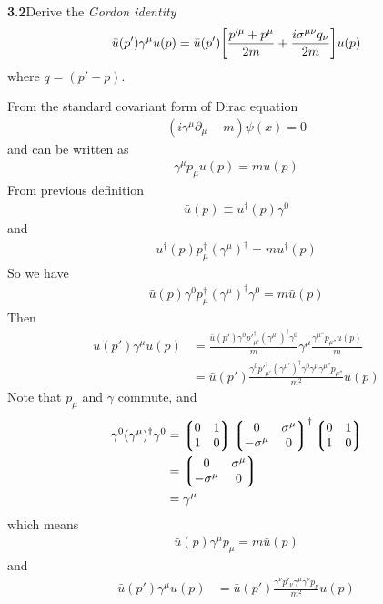 \documentclass{article}
\begin{document}
{\bf{3.2}}\quad Derive the \emph{Gordon identity}
\begin{align}\label{40}
  \bar{u}(p')\gamma^{\mu}u(p)=\bar{u}(p')\bqty{\frac{p'^{\mu}+p^{\mu}}{2m}+\frac{i\sigma^{\mu\nu}q_{\nu}}{2m}}u(p)
\end{align}
where $q=(p'-p)$.

From the standard covariant form of Dirac equation
\begin{align*}
  (i\gamma^{\mu}\partial_{\mu}-m)\psi(x)=0
\end{align*}
and can be written as
\begin{align}
  \gamma^{\mu}p_{\mu}u(p)=m u(p)
\end{align}
From previous definition
\begin{align*}
  \bar{u}(p)\equiv u^{\dagger}(p)\gamma^0
\end{align*}
and
\begin{align*}
  u^{\dagger}(p)p_{\mu}^{\dagger}(\gamma^{\mu})^{\dagger}=m u^{\dagger}(p)
\end{align*}
So we have
\begin{align*}
  \bar{u}(p)\gamma^0p_{\mu}^{\dagger}(\gamma^{\mu})^{\dagger}\gamma^0=m \bar{u}(p)
\end{align*}
Then
\begin{align*}
  \bar{u}(p')\gamma^{\mu}u(p)&=\frac{\bar{u}(p')\gamma^0p'_{\mu'}^{\dagger}(\gamma^{\mu'})^{\dagger}\gamma^0}{m}\gamma^{\mu}\frac{\gamma^{\mu''}p_{\mu''}u(p)}{m}\\
  &=\bar{u}(p')\frac{\gamma^0p'_{\mu'}^{\dagger}(\gamma^{\mu'})^{\dagger}\gamma^0\gamma^{\mu}\gamma^{\mu''}p_{\mu''}}{m^2}u(p)
\end{align*}
Note that $p_{\mu}$ and $\gamma$ commute, and
\begin{align*}
  \gamma^0(\gamma^{\mu})^{\dagger}\gamma^0&=\Pmqty{0&1\\1&0}\Pmqty{0&\sigma^{\mu}\\-\sigma^{\mu}&0}^{\dagger}\Pmqty{0&1\\1&0}\\
  &=\Pmqty{0&\sigma^{\mu}\\-\sigma^{\mu}&0}\\&=
  \gamma^{\mu}
\end{align*}
which means
\begin{align*}
  \bar{u}(p)\gamma^{\mu}p_{\mu}=m \bar{u}(p)
\end{align*}
and
\begin{align*}
  \bar{u}(p')\gamma^{\mu}u(p)&=\bar{u}(p')\frac{\gamma^{\nu}p'_{\nu}\gamma^{\mu}\gamma^{\nu}p_{\nu}}{m^2}u(p)
\end{align*}
\end{document}
